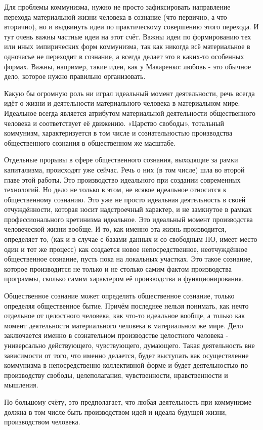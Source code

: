 \documentclass[../main]{subfiles}
\begin{document}
Для проблемы коммунизма, нужно не просто зафиксировать направление перехода материальной жизни человека в сознание (что первично, а что вторично), но и выдвинуть идеи по практическому совершению этого перехода. И тут очень важны частные идеи на этот счёт. Важны идеи по формированию тех или иных эмпирических форм коммунизма, так как никогда всё материальное в одночасье не переходит в сознание, а всегда делает это в каких-то особенных формах. Важны, например, такие идеи, как у Макаренко: любовь - это обычное дело, которое нужно правильно организовать.

Какую бы огромную роль ни играл идеальный момент деятельности, речь всегда идёт о жизни и деятельности материального человека в материальном мире. Идеальное всегда является атрибутом материальной деятельности общественного человека и соответствует её движению. «Царство свободы», тотальный коммунизм, характеризуется в том числе и сознательностью производства общественного сознания в общественном же масштабе.

Отдельные прорывы в сфере общественного сознания, выходящие за рамки капитализма, происходят уже сейчас. Речь о них (в том числе) шла во второй главе этой работы. Это производство идеального при создании современных технологий. Но дело не только в этом, не всякое идеальное относится к общественному сознанию. Это уже не просто идеальная деятельность в своей отчуждённости, которая носит надстроечный характер, и не замкнутое в рамках профессионального кретинизма идеальное. Это идеальный момент производства человеческой жизни вообще. И то, как именно эта жизнь производится, определяет то, (как и в случае с базами данных и со свободным ПО, имеет место один и тот же процесс) как создается новое непосредственное, неотчуждённое общественное сознание, пусть пока на локальных участках. Это такое сознание, которое производится не только и не столько самим фактом производства программы, сколько самим характером её производства и функционирования.

Общественное сознание может определять общественное сознание, только определяя общественное бытие. Причём последнее нельзя понимать, как нечто отдельное от целостного человека, как что-то идеальное вообще, а только как момент деятельности материального человека в материальном же мире. Дело заключается именно в сознательном производстве целостного человека - универсально действующего, чувствующего, думающего. Такая деятельность вне зависимости от того, что именно делается, будет выступать как осуществление коммунизма в непосредственно коллективной форме и будет деятельностью по производству свободы, целеполагания, чувственности, нравственности и мышления.

По большому счёту, это предполагает, что любая деятельность при коммунизме должна в том числе быть производством идей и идеала будущей жизни, производством человека.
\end{document}
